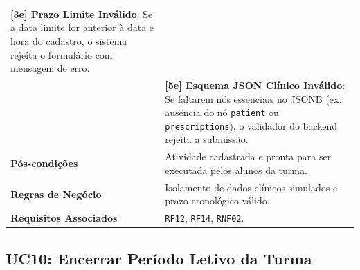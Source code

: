 \begin{table}[!ht]
\begin{tabularx}{\textwidth}{p{3.5cm} X}
\textbf{[3e] Prazo Limite Inválido}: Se a data limite for anterior à data e hora do cadastro, o sistema rejeita o formulário com mensagem de erro.\\
& \textbf{[5e] Esquema JSON Clínico Inválido}: Se faltarem nós essenciais no JSONB (ex.: ausência do nó \texttt{patient} ou \texttt{prescriptions}), o validador do backend rejeita a submissão. \\
\textbf{Pós-condições} & Atividade cadastrada e pronta para ser executada pelos alunos da turma. \\
\textbf{Regras de Negócio} & Isolamento de dados clínicos simulados e prazo cronológico válido. \\
\textbf{Requisitos Associados} & \texttt{RF12}, \texttt{RF14}, \texttt{RNF02}. \\
\bottomrule
\end{tabularx}
\end{table}

\subsection{UC10: Encerrar Período Letivo da Turma}
\label{uc10_especificacao}

